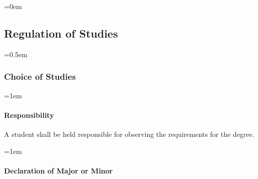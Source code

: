 \documentclass{manual}
\newcommand{\oldbreak}[1]{}
\let\oldsubsection\subsection
\renewcommand\subsection{\leftskip=0em\oldsubsection}
\let\oldsubsubsection\subsubsection
\renewcommand\subsubsection{\leftskip=0.5em\oldsubsubsection}
\let\oldparagraph\paragraph
\renewcommand\paragraph{\leftskip=1em\oldparagraph}
\begin{document}
\oldbreak{IV-3}



\subsection{Regulation of Studies}\label{sec:RegulationOfStudies}

\subsubsection{Choice of Studies}\label{sub:ChoiceOfStudies}

\paragraph{Responsibility}

A student shall be held responsible for observing the requirements for the degree.

\paragraph{Declaration of Major or Minor}
\end{document}
